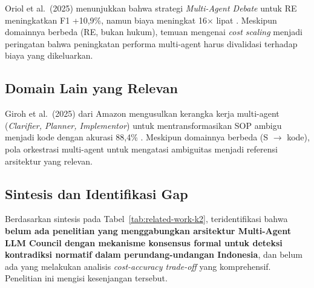 Oriol et al.\ (2025) menunjukkan bahwa strategi \textit{Multi-Agent Debate} untuk RE meningkatkan F1 +10,9\%, namun biaya meningkat 16$\times$ lipat \cite{oriol2025}. Meskipun domainnya berbeda (RE, bukan hukum), temuan mengenai \textit{cost scaling} menjadi peringatan bahwa peningkatan performa multi-agent harus divalidasi terhadap biaya yang dikeluarkan.

\subsection{Domain Lain yang Relevan}

Giroh et al.\ (2025) dari Amazon mengusulkan kerangka kerja multi-agent (\textit{Clarifier, Planner, Implementor}) untuk mentransformasikan SOP ambigu menjadi kode dengan akurasi 88,4\% \cite{giroh2025}. Meskipun domainnya berbeda (S $\rightarrow$ kode), pola orkestrasi multi-agent untuk mengatasi ambiguitas menjadi referensi arsitektur yang relevan.

\subsection{Sintesis dan Identifikasi Gap}

\begin{table}[htbp]
	\centering
	\caption{Perbandingan Penelitian Terkait}
	\label{tab:related-work-k2}
	\renewcommand{\arraystretch}{1.25}
\end{table}

Berdasarkan sintesis pada Tabel~\ref{tab:related-work-k2}, teridentifikasi bahwa \textbf{belum ada penelitian yang menggabungkan arsitektur Multi-Agent LLM Council dengan mekanisme konsensus formal untuk deteksi kontradiksi normatif dalam perundang-undangan Indonesia}, dan belum ada yang melakukan analisis \textit{cost-accuracy trade-off} yang komprehensif. Penelitian ini mengisi kesenjangan tersebut.